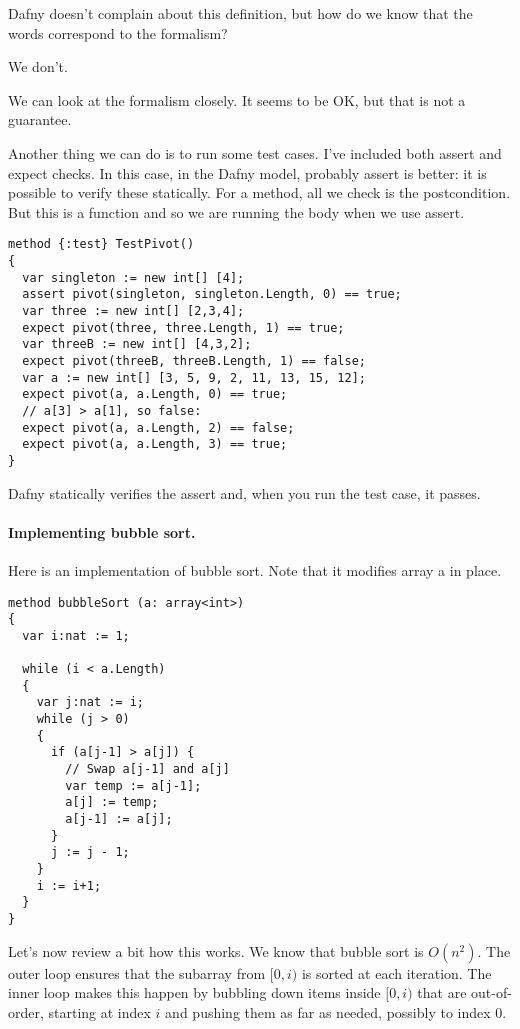 \documentclass[11pt]{article}
\begin{document}
Dafny doesn't complain about this definition, but how do we know that the words
correspond to the formalism?

We don't.

We can look at the formalism closely. It seems to be OK, but that is not a guarantee.

Another thing we can do is to run some test cases. I've included both \textsf{assert} and
\textsf{expect} checks. In this case, in the Dafny model, probably \textsf{assert} is better: it is possible
to verify these statically. For a \textsf{method}, all we check is the postcondition. But this is a function
and so we are running the body when we use \textsf{assert}.

\begin{lstlisting}[language=dafny]
method {:test} TestPivot()
{
  var singleton := new int[] [4];
  assert pivot(singleton, singleton.Length, 0) == true;
  var three := new int[] [2,3,4];
  expect pivot(three, three.Length, 1) == true;
  var threeB := new int[] [4,3,2];
  expect pivot(threeB, threeB.Length, 1) == false;
  var a := new int[] [3, 5, 9, 2, 11, 13, 15, 12];
  expect pivot(a, a.Length, 0) == true;
  // a[3] > a[1], so false:
  expect pivot(a, a.Length, 2) == false;
  expect pivot(a, a.Length, 3) == true;
}
\end{lstlisting}
Dafny statically verifies the \textsf{assert} and, when you run the test case, it passes.

\paragraph{Implementing bubble sort.} Here is an implementation of bubble sort.
Note that it modifies array \textsf{a} in place.

\begin{lstlisting}[language=dafny]
method bubbleSort (a: array<int>)
{
  var i:nat := 1;

  while (i < a.Length)
  {
    var j:nat := i;
    while (j > 0)
    {
      if (a[j-1] > a[j]) {
        // Swap a[j-1] and a[j]
        var temp := a[j-1];
        a[j] := temp;
        a[j-1] := a[j];
      }
      j := j - 1;
    }
    i := i+1;
  }
}
\end{lstlisting}

Let's now review a bit how this works. We know that bubble sort is $O(n^2)$. The outer loop
ensures that the subarray from $[0, i)$ is sorted at each iteration. The inner loop makes this
happen by bubbling down items inside $[0, i)$ that are out-of-order, starting at index $i$
and pushing them as far as needed, possibly to index 0.
\end{document}
